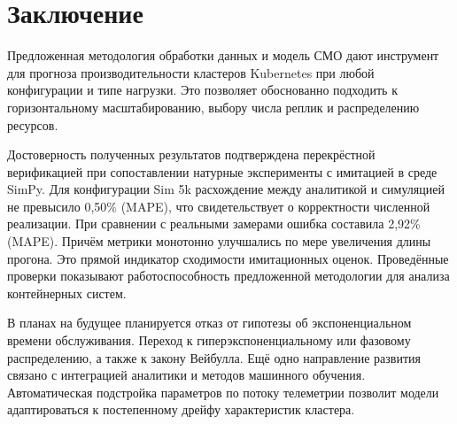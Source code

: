 \documentclass[12pt,a4paper]{article}
\begin{document}
\section{Заключение}
\label{sec:conclusion}

Предложенная методология обработки данных и модель СМО дают инструмент для прогноза производительности кластеров Kubernetes при любой конфигурации и типе нагрузки. Это позволяет обоснованно подходить к горизонтальному масштабированию, выбору числа реплик и распределению ресурсов.

Достоверность полученных результатов подтверждена перекрёстной верификацией при сопоставлении натурные эксперименты с имитацией в среде SimPy. Для конфигурации Sim 5k расхождение между аналитикой и симуляцией не превысило 0,50\% (MAPE), что свидетельствует о корректности численной реализации. При сравнении с реальными замерами ошибка составила 2,92\% (MAPE). Причём метрики монотонно улучшались по мере увеличения длины прогона. Это прямой индикатор сходимости имитационных оценок. Проведённые проверки показывают работоспособность предложенной методологии для анализа контейнерных систем.

В планах на будущее планируется отказ от гипотезы об экспоненциальном времени обслуживания. Переход к гиперэкспоненциальному или фазовому распределению, а также к закону Вейбулла. Ещё одно направление развития связано с интеграцией аналитики и методов машинного обучения. Автоматическая подстройка параметров по потоку телеметрии позволит модели адаптироваться к постепенному дрейфу характеристик кластера.

\printbibliography
\end{document}
